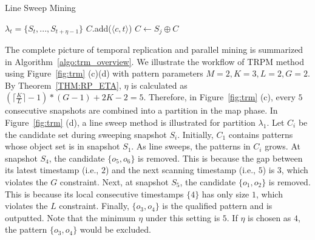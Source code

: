 \begin{algorithm}
\caption{Line Sweep Mining}
\label{algo:line-sweep}
\begin{algorithmic}[1]
\Require $\lambda_t = \{S_t, ..., S_{t+\eta-1}\}$
  \label{code:ls-can-set}
\label{code:ls-init-start}
\State $C$.add($\langle c, t \rangle $)
\EndFor
\label{code:ls-init-end}
\State $C \gets S_{j} \oplus C$ \label{code:ls-join}
	\label{code:ls-remove}
\EndFor
{}
\end{algorithmic}
\end{algorithm}




The complete picture of temporal replication and parallel mining is summarized in Algorithm~\ref{algo:trm_overview}. We illustrate the workflow of TRPM method using Figure~\ref{fig:trm} (c)(d) with pattern
parameters $M=2, K=3, L = 2, G=2$. By Theorem~\ref{THM:RP_ETA}, $\eta$ is calculated
as $(\lceil \frac{K}{L} \rceil-1) *(G-1)+2K - 2 = 5$. Therefore, 
in Figure~\ref{fig:trm} (c), every $5$ consecutive snapshots are combined 
into a partition in the map phase. In Figure~\ref{fig:trm} (d), a line sweep
method is illustrated for partition $\lambda_1$. Let $C_i$ be the candidate set
during sweeping snapshot $S_i$.
Initially, $C_1$ contains patterns whose object set is in snapshot $S_1$.
As line sweeps, the patterns in $C_i$ grows. At snapshot $S_4$, the candidate
$\{o_5,o_6\}$ is removed. This is because the gap between its latest timestamp (i.e., $2$)
and the next scanning timestamp (i.e., $5$) is $3$, which violates the $G$ constraint.
Next, at snapshot $S_5$, the candidate $\{o_1,o_2\}$ is removed. This is
because its local consecutive timestamps $\{4\}$ has only size $1$,
which violates the $L$ constraint.
Finally, $\{o_3,o_4\}$ is the qualified pattern and is outputted. Note that the minimum $\eta$
under this setting is $5$. If $\eta$ is chosen as $4$, the pattern $\{o_3,o_4\}$ would be excluded. 

